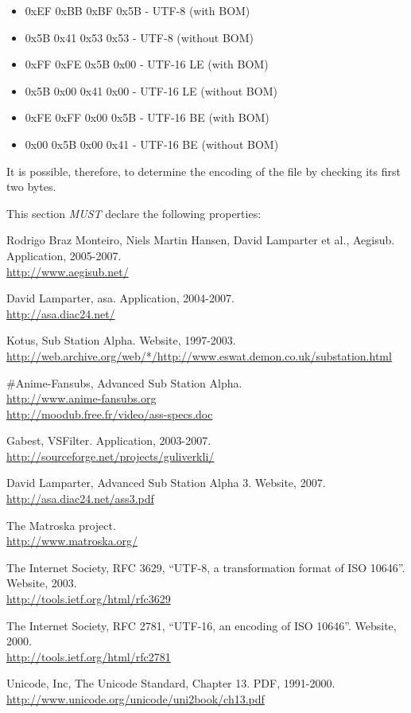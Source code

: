 \documentclass{spec}
\begin{document}
\begin{itemize}
\item 0xEF 0xBB 0xBF 0x5B - UTF-8 (with BOM)
\item 0x5B 0x41 0x53 0x53 - UTF-8 (without BOM)
\item 0xFF 0xFE 0x5B 0x00 - UTF-16 LE (with BOM)
\item 0x5B 0x00 0x41 0x00 - UTF-16 LE (without BOM)
\item 0xFE 0xFF 0x00 0x5B - UTF-16 BE (with BOM)
\item 0x00 0x5B 0x00 0x41 - UTF-16 BE (without BOM)
\end{itemize}

It is possible, therefore, to determine the encoding of the file by checking its first two bytes.

This section \emph{MUST} declare the following properties:


\begin{thebibliography}{1}

 Rodrigo Braz Monteiro, Niels Martin Hansen, David Lamparter et al., Aegisub. Application, 2005-2007.\\
\url{http://www.aegisub.net/}

 David Lamparter, asa. Application, 2004-2007.\\
\url{http://asa.diac24.net/}

 Kotus, Sub Station Alpha. Website, 1997-2003.\\
\url{http://web.archive.org/web/*/http://www.eswat.demon.co.uk/substation.html}

 \#Anime-Fansubs, Advanced Sub Station Alpha.\\
\url{http://www.anime-fansubs.org}\\
\url{http://moodub.free.fr/video/ass-specs.doc}

 Gabest, VSFilter. Application, 2003-2007.\\
\url{http://sourceforge.net/projects/guliverkli/}

 David Lamparter, Advanced Sub Station Alpha 3. Website, 2007.\\
\url{http://asa.diac24.net/ass3.pdf}

 The Matroska project.\\
\url{http://www.matroska.org/}

 The Internet Society, RFC 3629, "`UTF-8, a transformation format of ISO 10646"'. Website, 2003.\\
\url{http://tools.ietf.org/html/rfc3629}

 The Internet Society, RFC 2781, "`UTF-16, an encoding of ISO 10646"'. Website, 2000.\\
\url{http://tools.ietf.org/html/rfc2781}

 Unicode, Inc, The Unicode Standard, Chapter 13. PDF, 1991-2000.\\
\url{http://www.unicode.org/unicode/uni2book/ch13.pdf}

\end{thebibliography}
\end{document}
